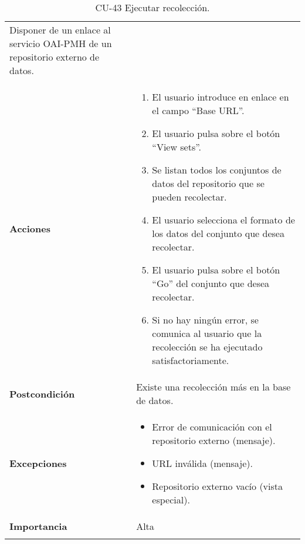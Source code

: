 \begin{longtable}[]{@{}ll@{}}
\begin{minipage}[t]{0.76\columnwidth}
Disponer de un enlace al servicio OAI-PMH de un repositorio externo de
datos.\strut
\end{minipage}\tabularnewline
\begin{minipage}[t]{0.18\columnwidth}\raggedright
\textbf{Acciones}\strut
\end{minipage} & \begin{minipage}[t]{0.76\columnwidth}\raggedright
\begin{enumerate}
\def\labelenumi{\arabic{enumi}.}
\tightlist
\item
  El usuario introduce en enlace en el campo ``Base URL''.
\item
  El usuario pulsa sobre el botón ``View sets''.
\item
  Se listan todos los conjuntos de datos del repositorio que se pueden
  recolectar.
\item
  El usuario selecciona el formato de los datos del conjunto que desea
  recolectar.
\item
  El usuario pulsa sobre el botón ``Go'' del conjunto que desea
  recolectar.
\item
  Si no hay ningún error, se comunica al usuario que la recolección se
  ha ejecutado satisfactoriamente.
\end{enumerate}\strut
\end{minipage}\tabularnewline
\begin{minipage}[t]{0.18\columnwidth}\raggedright
\textbf{Postcondición}\strut
\end{minipage} & \begin{minipage}[t]{0.76\columnwidth}\raggedright
Existe una recolección más en la base de datos.\strut
\end{minipage}\tabularnewline
\begin{minipage}[t]{0.18\columnwidth}\raggedright
\textbf{Excepciones}\strut
\end{minipage} & \begin{minipage}[t]{0.76\columnwidth}\raggedright
\begin{itemize}
\tightlist
\item
  Error de comunicación con el repositorio externo (mensaje).
\item
  URL inválida (mensaje).
\item
  Repositorio externo vacío (vista especial).
\end{itemize}\strut
\end{minipage}\tabularnewline
\begin{minipage}[t]{0.18\columnwidth}\raggedright
\textbf{Importancia}\strut
\end{minipage} & \begin{minipage}[t]{0.76\columnwidth}\raggedright
Alta\strut
\end{minipage}\tabularnewline
\bottomrule
\caption{CU-43 Ejecutar recolección.}
\end{longtable}

